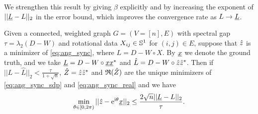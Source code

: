 We strengthen this result by giving $\beta$ explicitly and by increasing the exponent of $|| \underline{L} - L ||_2$ in the error bound, which improves the convergence rate as $L \to \underline{L}$.

\begin{theorem}
  Given a connected, weighted graph $G = (V = [n], E)$ with spectral gap $\tau = \lambda_2(D - W)$ and rotational data $X_{ij} \in \mathbb{S}^1$ for $(i, j) \in E$, suppose that $\hat{z}$ is a minimizer of \eqref{eq:ang_sync}, where $L = D - W \circ X$.  By $\underline{x}$ we denote the ground truth, and we take $\underline{L} = D - W \circ \underline{x} \underline{x}^*$ and $\hat{L} = D - W \circ \hat{z} \hat{z}^*$.  Then if $||L - \hat{L}||_2 < \frac{\tau}{1 + \sqrt{n}}$, $\hat{Z} = \hat{z} \hat{z}^*$ and $\mathfrak{R}(\hat{Z})$ are the unique minimizers of \eqref{eq:ang_sync_sdp} and \eqref{eq:ang_sync_real} and we have \[\min_{\theta \in [0, 2\pi)} || \hat{z} - \mathrm{e}^{\mathrm{i} \theta} \underline{x} ||_2 \le \dfrac{2 \sqrt{n} ||\underline{L} - L||_2}{\tau}.\]
  \label{thm:ang_sync_dual}
\end{theorem}

